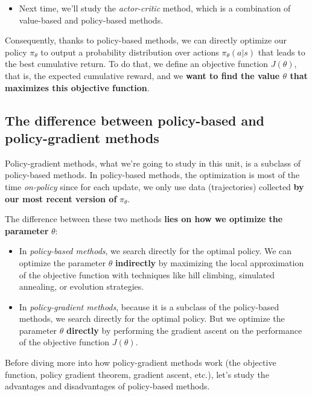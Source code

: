 \documentclass[11pt,a4paper]{article}
\begin{document}
\begin{itemize}
\tightlist
\item
  Next time, we'll study the \emph{actor-critic} method, which is a combination of value-based and policy-based methods.
\end{itemize}

Consequently, thanks to policy-based methods, we can directly optimize our policy \(\pi_\theta\) to output a probability distribution over actions \(\pi_\theta(a|s)\) that leads to the best cumulative return. To do that, we define an objective function \(J(\theta)\), that is, the expected cumulative reward, and we \textbf{want to find the value \(\theta\) that maximizes this objective function}.

\subsection{The difference between policy-based and policy-gradient methods}\label{the-difference-between-policy-based-and-policy-gradient-methods}

Policy-gradient methods, what we're going to study in this unit, is a subclass of policy-based methods. In policy-based methods, the optimization is most of the time \emph{on-policy} since for each update, we only use data (trajectories) collected \textbf{by our most recent version of} \(\pi_\theta\).

The difference between these two methods \textbf{lies on how we optimize the parameter} \(\theta\):

\begin{itemize}
\tightlist
\item
  In \emph{policy-based methods}, we search directly for the optimal policy. We can optimize the parameter \(\theta\) \textbf{indirectly} by maximizing the local approximation of the objective function with techniques like hill climbing, simulated annealing, or evolution strategies.
\item
  In \emph{policy-gradient methods}, because it is a subclass of the policy-based methods, we search directly for the optimal policy. But we optimize the parameter \(\theta\) \textbf{directly} by performing the gradient ascent on the performance of the objective function \(J(\theta)\).
\end{itemize}

Before diving more into how policy-gradient methods work (the objective function, policy gradient theorem, gradient ascent, etc.), let's study the advantages and disadvantages of policy-based methods.
\end{document}
